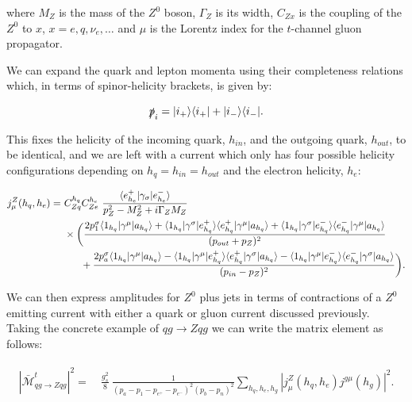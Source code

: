 		where $M_Z$ is the mass of the $Z^0$ boson, $\Gamma_Z$ is its width, $C_{Zx}$ is
		the coupling of the $Z^0$ to $x$, $x=e,q,\nu_e,\ldots$ and $\mu$ is the Lorentz
		index for the $t$-channel gluon propagator.

		We can expand the quark and lepton momenta using their completeness relations which,
		in terms of spinor-helicity brackets, is given by:

		\begin{equation}
			\slashed p_{i} = |i_+\rangle\langle i_+| + |i_-\rangle\langle i_-|.
		\end{equation}

		This fixes the helicity of the incoming quark, $h_{in}$, and the outgoing quark,
		$h_{out}$, to be identical, and we are left with a current which only has four
		possible helicity configurations depending on $h_q = h_{in} = h_{out}$ and the
		electron helicity, $h_e$:

		\begin{align}
		  \begin{split}
		    j^Z_\mu(h_q, h_e) = &\ C_{Zq}^{h_q}C_{Ze}^{h_e}\ \frac{\bk{e^+_{h_e}}{\gl{\sigma}}{e^-_{h_e}}}{p_Z^2 -
		      M^2_Z + i\Gamma_ZM_Z} \\ &\ \times\bigg(\frac{2p_1^\sigma\bk{1_{h_q}}{\gu{\mu}}{a_{h_q}} +
		      \bk{1_{h_q}}{\gu{\sigma}}{e^+_{h_q}} \bk{e^+_{h_q}}{\gu{\mu}}{a_{h_q}} +
		      \bk{1_{h_q}}{\gu{\sigma}}{e^-_{h_q}} \bk{e^-_{h_q}}{\gu{\mu}}{a_{h_q}}}
		    {(p_{out} + p_Z)^2}\\
		    &\qquad + \frac{ 2p_a^\sigma\bk{1_{h_q}}{\gu{\mu}}{a_{h_q}} -
		      \bk{1_{h_q}}{\gu{\mu}}{e^+_{h_q}} \bk{e^+_{h_q}}{\gu{\sigma}}{a_{h_q}} -
		      \bk{1_{h_q}}{\gu{\mu}}{e^-_{h_q}} \bk{e^-_{h_q}}{\gu{\sigma}}{a_{h_q}}}
		    {(p_{in} - p_Z)^2}\bigg).
		    \label{eq:Zcurrent}
		  \end{split}
		\end{align}

		We can then express amplitudes for $Z^0$ plus jets in terms of contractions of
		a $Z^0$ emitting current with either a quark or gluon current discussed previously.  Taking
		the concrete example of $qg\to Zqg$ we can write the matrix element as follows:

		\begin{align}
		\begin{split}
			{|\bar{\mathcal{M}}_{qg\to Zqg}^{t}|}^2 =& \ \frac{g_s^2}{8}\
			\frac{1}{(p_a-p_1-p_{e^+}-p_{e^-})^2 (p_b-p_n)^2}  \sum_{h_q,h_e,h_g}|
			j^{Z}_\mu(h_q,h_e) j^{g\mu}(h_g)|^2.
		  	\label{eq:qgamp}
		\end{split}
		\end{align}

